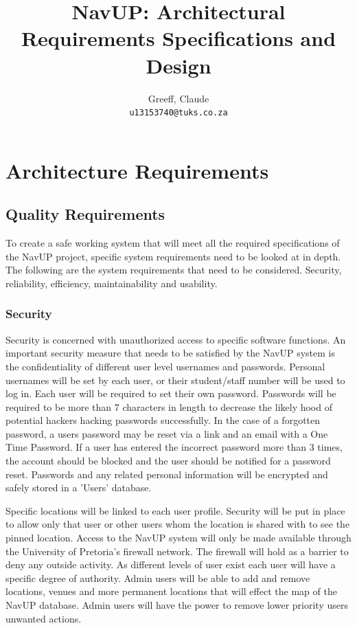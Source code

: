 \documentclass{article}
\title{NavUP: Architectural Requirements Specifications and Design}
\author{	 
	Greeff, Claude\\
	\texttt{u13153740@tuks.co.za}
	\and	
}
\begin{document}
	\maketitle
	\section{Architecture Requirements}
		\subsection{Quality Requirements}
		 To create a safe working system that will meet all the required specifications of the NavUP project, specific system requirements need to be looked at in depth. The following are the system requirements that need to be considered. Security, reliability, efficiency, maintainability and usability.
		 
		 \subsubsection{Security}
		 Security is concerned with unauthorized access to specific software functions. An important security measure that needs to be satisfied by the NavUP system is the confidentiality of different user level usernames and passwords. Personal usernames will be set by each user, or their student/staff number will be used to log in. Each user will be required to set their own password. Passwords will be required to be more than 7 characters in length to decrease the likely hood of potential hackers hacking passwords successfully. In the case of a forgotten password, a users password may be reset via a link and an email with a One Time Password. If a user has entered the incorrect password more than 3 times, the account should be blocked and the user should be notified for a password reset. Passwords and any related personal information will be encrypted and safely stored in a 'Users' database.
		 
		  Specific locations will be linked to each user profile. Security will be put in place to allow only that user or other users whom the location is shared with to see the pinned location. Access to the NavUP system will only be made available through the University of Pretoria's firewall network. The firewall will hold as a barrier to deny any outside activity. As different levels of user exist each user will have a specific degree of authority. Admin users will be able to add and remove locations, venues and more permanent locations that will effect the map of the NavUP database. Admin users will have the power to remove lower priority users unwanted actions.
		 
\end{document}
